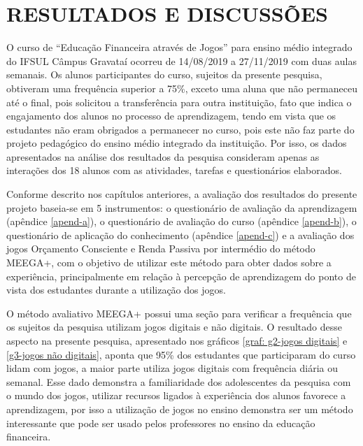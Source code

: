 \chapter{RESULTADOS E DISCUSSÕES}
O curso de “Educação Financeira através de Jogos” para ensino médio integrado do IFSUL Câmpus Gravataí ocorreu de 14/08/2019 a 27/11/2019 com duas aulas semanais. Os alunos participantes do curso, sujeitos da presente pesquisa, obtiveram uma frequência superior a 75\%, exceto uma aluna que não permaneceu até o final, pois solicitou a transferência para outra instituição, fato que indica o engajamento dos alunos no processo de aprendizagem, tendo em vista que os estudantes não eram obrigados a permanecer no curso, pois este não faz parte do projeto pedagógico do ensino médio integrado da instituição. Por isso, os dados apresentados na análise dos resultados da pesquisa consideram apenas as interações dos 18 alunos com as atividades, tarefas e questionários elaborados.

Conforme descrito nos capítulos anteriores, a avaliação dos resultados do presente projeto baseia-se em 5 instrumentos: o questionário de avaliação da aprendizagem (apêndice \ref{apend-a}), o questionário de avaliação do curso (apêndice \ref{apend-b}), o questionário de aplicação do conhecimento (apêndice \ref{apend-c}) e a avaliação dos jogos Orçamento Consciente e Renda Passiva por intermédio do método MEEGA+, com o objetivo de utilizar este método para obter dados sobre a experiência, principalmente em relação à percepção de aprendizagem do ponto de vista dos estudantes durante a utilização dos jogos.

O método avaliativo MEEGA+ possui uma seção para verificar a frequência que os sujeitos da pesquisa utilizam jogos digitais e não digitais. O resultado desse aspecto na presente pesquisa, apresentado nos gráficos \ref{graf: g2-jogos digitais} e \ref{g3-jogos não digitais}, aponta que 95\% dos estudantes que participaram do curso lidam com jogos, a maior parte utiliza jogos digitais com frequência diária ou semanal. Esse dado demonstra a familiaridade dos adolescentes da pesquisa com o mundo dos jogos, utilizar recursos ligados à experiência dos alunos favorece a aprendizagem, por isso a utilização de jogos no ensino demonstra ser um método interessante que pode ser usado pelos professores no ensino da educação financeira.


